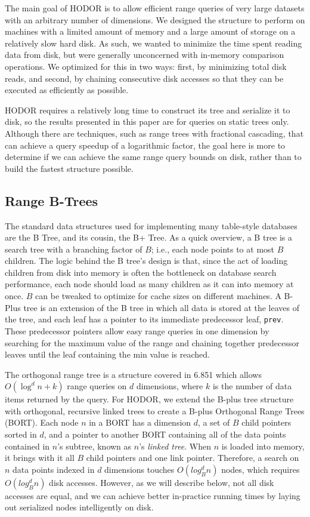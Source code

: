 \documentclass[11pt, oneside]{article}
\newcommand{\ms}{\texttt}
\begin{document}
The main goal of HODOR is to allow efficient range queries of very large
datasets with an arbitrary number of dimensions. We designed the structure to
perform on machines with a limited amount of memory and a large amount of
storage on a relatively slow hard disk. As such, we wanted to minimize the
time spent reading data from disk, but were generally unconcerned with
in-memory comparison operations. We optimized for this in two ways: first, by
minimizing total disk reads, and second, by chaining consecutive disk accesses
so that they can be executed as efficiently as possible. 

HODOR requires a relatively long time to construct its tree and serialize it to
disk, so the results presented in this paper are for queries on static trees
only. Although there are techniques, such as range trees with fractional cascading,
that can achieve a query speedup of a logarithmic factor, the goal here is more
to determine if we can achieve the same range query bounds on disk, rather than
to build the fastest structure possible.

\subsection{Range B-Trees}

The standard data structures used for implementing many table-style databases
are the B Tree, and its cousin, the B+ Tree. As a quick overview, a B tree is a
search tree with a branching factor of $B$; i.e., each node points to at most
$B$ children. The logic behind the B tree's design is that, since the act of
loading children from disk into memory is often the bottleneck on database
search performance, each node should load as many children as it can into memory
at once. $B$ can be tweaked to optimize for cache sizes on different machines.
A B-Plus tree is an extension of the B tree in which all data is stored at the
leaves of the tree, and each leaf has a pointer to its immediate predecessor
leaf, \ms{prev}. These predecessor pointers allow easy range queries in one
dimension by searching for the maximum value of the range and chaining together
predecessor leaves until the leaf containing the min value is reached.

The orthogonal range tree is a structure covered in 6.851 which allows $O(\log^d
n + k)$ range queries on $d$ dimensions, where $k$ is the number of data items
returned by the query. For HODOR, we extend the B-plus tree structure with
orthogonal, recursive linked trees to create a B-plus Orthogonal Range Trees
(BORT). Each node $n$ in a BORT has a dimension $d$, a set of $B$ child pointers
sorted in $d$, and a pointer to another BORT containing all of the data points
contained in $n$'s subtree, known as $n$'s \textit{linked tree}.  When $n$ is
loaded into memory, it brings with it all $B$ child pointers and one link
pointer.  Therefore, a search on $n$ data points indexed in $d$ dimensions
touches $O(log^d_B n)$ nodes, which requires $O(log^d_B n)$ disk accesses.
However, as we will describe below, not all disk accesses are equal, and we can
achieve better in-practice running times by laying out serialized nodes
intelligently on disk.
\end{document}
